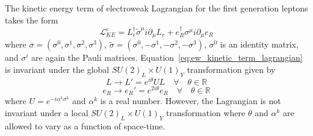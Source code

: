 The kinetic energy term of electroweak Lagrangian for the first generation leptons takes the form
\begin{equation}\label{eq:ew_kinetic_term_lagrangian}
	\mathcal{L}_{KE}^{e}=L_{e}^{\dagger}\tilde{\sigma}^{\mu}i\partial_{\mu}L_{e}+e_{R}^{\dagger}\sigma^{\mu}i\partial_{\mu}e_{R}
\end{equation}
where $\sigma=\left(\sigma^{0},\sigma^{1},\sigma^{2},\sigma^{3}\right)$, $\tilde{\sigma}=\left(\sigma^{0},-\sigma^{1},-\sigma^{2},-\sigma^{3}\right)$, $\sigma^{0}$ is an identity matrix, and $\sigma^{i}$ are again the Pauli matrices.
Equation~\ref{eq:ew_kinetic_term_lagrangian} is invariant under the global $SU\left(2\right)_{L}{\times}U\left(1\right)_{Y}$ transformation given by
\begin{equation}
	L{\rightarrow}L'=e^{i\theta}UL\hspace{1em}\forall\hspace{1em}\theta\in\mathbb{R}
\end{equation}
\begin{equation}
	e_{R}{\rightarrow}e_{R}'=e^{2i\theta}e_{R}\hspace{1em}\forall\hspace{1em}\theta\in\mathbb{R}
\end{equation}
where $U=e^{-i\alpha^{k}\sigma^{k}}$ and $\alpha^{k}$ is a real number.
However, the Lagrangian is not invariant under a local $SU\left(2\right)_{L}{\times}U\left(1\right)_{Y}$ transformation where $\theta$ and $\alpha^{k}$ are allowed to vary as a function of space-time.

